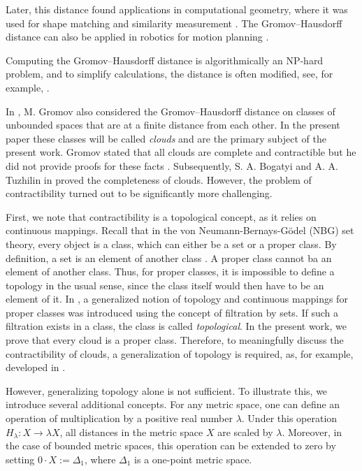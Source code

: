 \documentclass[leqno]{article}
\begin{document}
Later, this distance found applications in computational geometry, where it was used for shape matching and similarity measurement \cite{memoli1}. The Gromov--Hausdorff distance can also be applied in robotics for motion planning \cite{robotics}.  

Computing the Gromov--Hausdorff distance is algorithmically an NP-hard problem, and to simplify calculations, the distance is often modified, see, for example, \cite{memoli2}.  

In \cite{Gromov99}, M. Gromov also considered the Gromov--Hausdorff distance on classes of unbounded spaces that are at a finite distance from each other. In the present paper these classes will be called \emph{clouds} and are the primary subject of the present work. Gromov stated that all clouds are complete and contractible but he did not provide proofs for these facts \cite{Gromov99}. Subsequently, S. A. Bogatyi and A. A. Tuzhilin in \cite{TuzhBog1} proved the completeness of clouds. However, the problem of contractibility turned out to be significantly more challenging.  

First, we note that contractibility is a topological concept, as it relies on continuous mappings. Recall that in the von Neumann-Bernays-G\"odel (NBG) set theory, every object is a class, which can either be a set or a proper class. By definition, a set is an element of another class \cite{Neumann, Bernays, Godel}. A proper class cannot ba an element of another class. Thus, for proper classes, it is impossible to define a topology in the usual sense, since the class itself would then have to be an element of it. In \cite{BorIvTuzh1}, a generalized notion of topology and continuous mappings for proper classes was introduced using the concept of filtration by sets. If such a filtration exists in a class, the class is called \emph{topological}. In the present work, we prove that every cloud is a proper class. Therefore, to meaningfully discuss the contractibility of clouds, a generalization of topology is required, as, for example, developed in \cite{BorIvTuzh1}.

However, generalizing topology alone is not sufficient. To illustrate this, we introduce several additional concepts.  
For any metric space, one can define an operation of multiplication by a positive real number $\lambda$. Under this operation $H_{\lambda}\colon X \to \lambda X$, all distances in the metric space $X$ are scaled by $\lambda$. Moreover, in the case of bounded metric spaces, this operation can be extended to zero by setting $0 \cdot X := \Delta_1$, where $\Delta_1$ is a one-point metric space.  
\end{document}
